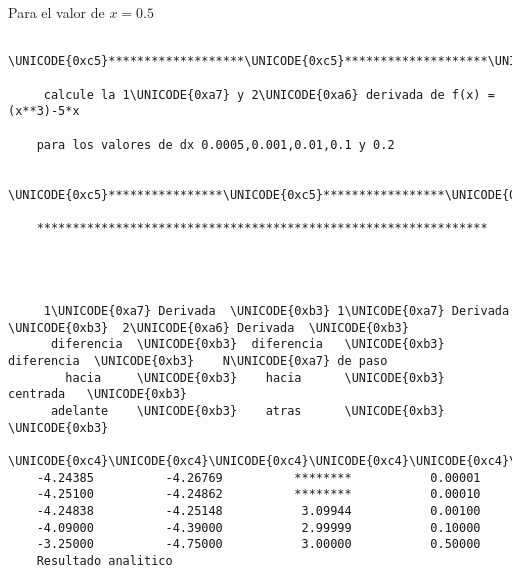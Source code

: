 \documentclass{article}
\begin{document}
Para el valor de $x=0.5$
\begin{verbatim}
 \UNICODE{0xc5}*******************\UNICODE{0xc5}********************\UNICODE{0xc5}********************\UNICODE{0xc5}
 
     calcule la 1\UNICODE{0xa7} y 2\UNICODE{0xa6} derivada de f(x) = (x**3)-5*x
 
    para los valores de dx 0.0005,0.001,0.01,0.1 y 0.2
 
    \UNICODE{0xc5}****************\UNICODE{0xc5}*****************\UNICODE{0xc5}**************************\UNICODE{0xc5}
 
    ***************************************************************
 
                                                    
                                                    
                                                   
     1\UNICODE{0xa7} Derivada  \UNICODE{0xb3} 1\UNICODE{0xa7} Derivada   \UNICODE{0xb3}  2\UNICODE{0xa6} Derivada  \UNICODE{0xb3}             
      diferencia  \UNICODE{0xb3}  diferencia   \UNICODE{0xb3}   diferencia  \UNICODE{0xb3}    N\UNICODE{0xa7} de paso
        hacia     \UNICODE{0xb3}    hacia      \UNICODE{0xb3}    centrada   \UNICODE{0xb3}             
      adelante    \UNICODE{0xb3}    atras      \UNICODE{0xb3}               \UNICODE{0xb3}             
    \UNICODE{0xc4}\UNICODE{0xc4}\UNICODE{0xc4}\UNICODE{0xc4}\UNICODE{0xc4}\UNICODE{0xc4}\UNICODE{0xc4}\UNICODE{0xc4}\UNICODE{0xc4}\UNICODE{0xc4}\UNICODE{0xc4}\UNICODE{0xc4}\UNICODE{0xc4}\UNICODE{0xc4}\UNICODE{0xc5}\UNICODE{0xc4}\UNICODE{0xc4}\UNICODE{0xc4}\UNICODE{0xc4}\UNICODE{0xc4}\UNICODE{0xc4}\UNICODE{0xc4}\UNICODE{0xc4}\UNICODE{0xc4}\UNICODE{0xc4}\UNICODE{0xc4}\UNICODE{0xc4}\UNICODE{0xc4}\UNICODE{0xc4}\UNICODE{0xc4}\UNICODE{0xc5}\UNICODE{0xc4}\UNICODE{0xc4}\UNICODE{0xc4}\UNICODE{0xc4}\UNICODE{0xc4}\UNICODE{0xc4}\UNICODE{0xc4}\UNICODE{0xc4}\UNICODE{0xc4}\UNICODE{0xc4}\UNICODE{0xc4}\UNICODE{0xc4}\UNICODE{0xc4}\UNICODE{0xc4}\UNICODE{0xc4}\UNICODE{0xc5}\UNICODE{0xc4}\UNICODE{0xc4}\UNICODE{0xc4}\UNICODE{0xc4}\UNICODE{0xc4}\UNICODE{0xc4}\UNICODE{0xc4}\UNICODE{0xc4}\UNICODE{0xc4}\UNICODE{0xc4}\UNICODE{0xc4}\UNICODE{0xc4}\UNICODE{0xc4}\UNICODE{0xc4}
    -4.24385          -4.26769          ********           0.00001
    -4.25100          -4.24862          ********           0.00010
    -4.24838          -4.25148           3.09944           0.00100
    -4.09000          -4.39000           2.99999           0.10000
    -3.25000          -4.75000           3.00000           0.50000
    Resultado analitico
 

\end{verbatim}
\end{document}
